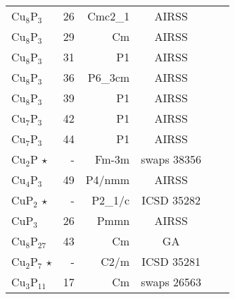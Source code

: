 \begin{tabular}{l r r c l l}
  Cu$_\text{8}$P$_\text{3}$               &          26          &        Cmc2_1        &             AIRSS              &                                \\
  Cu$_\text{8}$P$_\text{3}$               &          29          &          Cm          &             AIRSS              &                                \\
  Cu$_\text{8}$P$_\text{3}$               &          31          &          P1          &             AIRSS              &                                \\
  Cu$_\text{8}$P$_\text{3}$               &          36          &        P6_3cm        &             AIRSS              &                                \\
  Cu$_\text{8}$P$_\text{3}$               &          39          &          P1          &             AIRSS              &                                \\
  Cu$_\text{7}$P$_\text{3}$               &          42          &          P1          &             AIRSS              &                                \\
  Cu$_\text{7}$P$_\text{3}$               &          44          &          P1          &             AIRSS              &                                \\
        Cu$_\text{2}$P          $\star$   &          -           &       Fm-3m         &          swaps 38356           &                                \\
  Cu$_\text{4}$P$_\text{3}$               &          49          &        P4/nmm        &             AIRSS              &                                \\
        CuP$_\text{2}$          $\star$   &          -           &       P2_1/c        &           ICSD 35282           &                                \\
        CuP$_\text{3}$                    &          26          &         Pmmn         &             AIRSS              &                                \\
  Cu$_\text{8}$P$_\text{27}$              &          43          &          Cm          &               GA               &                                \\
  Cu$_\text{2}$P$_\text{7}$     $\star$   &          -           &        C2/m         &           ICSD 35281           &                                \\
  Cu$_\text{3}$P$_\text{11}$              &          17          &          Cm          &          swaps 26563           &                                \\

\end{tabular}
